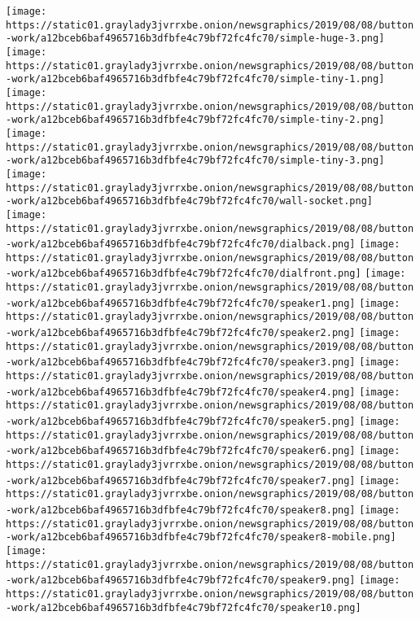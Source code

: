\texttt{[image: https://static01.graylady3jvrrxbe.onion/newsgraphics/2019/08/08/button-work/a12bceb6baf4965716b3dfbfe4c79bf72fc4fc70/simple-huge-3.png]}
\texttt{[image: https://static01.graylady3jvrrxbe.onion/newsgraphics/2019/08/08/button-work/a12bceb6baf4965716b3dfbfe4c79bf72fc4fc70/simple-tiny-1.png]}
\texttt{[image: https://static01.graylady3jvrrxbe.onion/newsgraphics/2019/08/08/button-work/a12bceb6baf4965716b3dfbfe4c79bf72fc4fc70/simple-tiny-2.png]}
\texttt{[image: https://static01.graylady3jvrrxbe.onion/newsgraphics/2019/08/08/button-work/a12bceb6baf4965716b3dfbfe4c79bf72fc4fc70/simple-tiny-3.png]}
\texttt{[image: https://static01.graylady3jvrrxbe.onion/newsgraphics/2019/08/08/button-work/a12bceb6baf4965716b3dfbfe4c79bf72fc4fc70/wall-socket.png]}
\texttt{[image: https://static01.graylady3jvrrxbe.onion/newsgraphics/2019/08/08/button-work/a12bceb6baf4965716b3dfbfe4c79bf72fc4fc70/dialback.png]}
\texttt{[image: https://static01.graylady3jvrrxbe.onion/newsgraphics/2019/08/08/button-work/a12bceb6baf4965716b3dfbfe4c79bf72fc4fc70/dialfront.png]}
\texttt{[image: https://static01.graylady3jvrrxbe.onion/newsgraphics/2019/08/08/button-work/a12bceb6baf4965716b3dfbfe4c79bf72fc4fc70/speaker1.png]}
\texttt{[image: https://static01.graylady3jvrrxbe.onion/newsgraphics/2019/08/08/button-work/a12bceb6baf4965716b3dfbfe4c79bf72fc4fc70/speaker2.png]}
\texttt{[image: https://static01.graylady3jvrrxbe.onion/newsgraphics/2019/08/08/button-work/a12bceb6baf4965716b3dfbfe4c79bf72fc4fc70/speaker3.png]}
\texttt{[image: https://static01.graylady3jvrrxbe.onion/newsgraphics/2019/08/08/button-work/a12bceb6baf4965716b3dfbfe4c79bf72fc4fc70/speaker4.png]}
\texttt{[image: https://static01.graylady3jvrrxbe.onion/newsgraphics/2019/08/08/button-work/a12bceb6baf4965716b3dfbfe4c79bf72fc4fc70/speaker5.png]}
\texttt{[image: https://static01.graylady3jvrrxbe.onion/newsgraphics/2019/08/08/button-work/a12bceb6baf4965716b3dfbfe4c79bf72fc4fc70/speaker6.png]}
\texttt{[image: https://static01.graylady3jvrrxbe.onion/newsgraphics/2019/08/08/button-work/a12bceb6baf4965716b3dfbfe4c79bf72fc4fc70/speaker7.png]}
\texttt{[image: https://static01.graylady3jvrrxbe.onion/newsgraphics/2019/08/08/button-work/a12bceb6baf4965716b3dfbfe4c79bf72fc4fc70/speaker8.png]}
\texttt{[image: https://static01.graylady3jvrrxbe.onion/newsgraphics/2019/08/08/button-work/a12bceb6baf4965716b3dfbfe4c79bf72fc4fc70/speaker8-mobile.png]}
\texttt{[image: https://static01.graylady3jvrrxbe.onion/newsgraphics/2019/08/08/button-work/a12bceb6baf4965716b3dfbfe4c79bf72fc4fc70/speaker9.png]}
\texttt{[image: https://static01.graylady3jvrrxbe.onion/newsgraphics/2019/08/08/button-work/a12bceb6baf4965716b3dfbfe4c79bf72fc4fc70/speaker10.png]}

